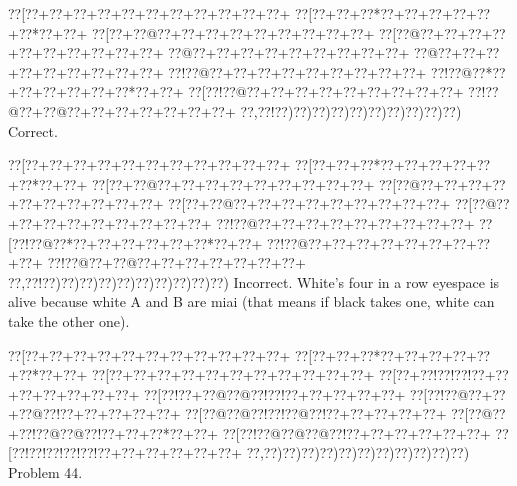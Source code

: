 \documentclass[a5paper]{article}
\begin{document}
\begin{center}
{\goo
\0??[\0??+\0??+\0??+\0??+\0??+\0??+\0??+\0??+\0??+\0??+\0??+
\0??[\0??+\0??+\0??*\0??+\0??+\0??+\0??+\0??+\0??*\0??+\0??+
\0??[\0??+\0??@\0??+\0??+\0??+\0??+\0??+\0??+\0??+\0??+\0??+
\0??[\0??@\0??+\0??+\0??+\0??+\0??+\0??+\0??+\0??+\0??+\0??+
\0??@\0??+\0??+\0??+\0??+\0??+\0??+\0??+\0??+\0??+
\0??@\0??+\0??+\0??+\0??+\0??+\0??+\0??+\0??+\0??+
\0??!\0??@\0??+\0??+\0??+\0??+\0??+\0??+\0??+\0??+\0??+
\0??!\0??@\0??*\0??+\0??+\0??+\0??+\0??+\0??*\0??+\0??+
\0??[\0??!\0??@\0??+\0??+\0??+\0??+\0??+\0??+\0??+\0??+\0??+
\0??!\0??@\0??+\0??@\0??+\0??+\0??+\0??+\0??+\0??+\0??+
\0??,\0??!\0??)\0??)\0??)\0??)\0??)\0??)\0??)\0??)\0??)\0??)
}
Correct. 

\end{center}
\begin{center}
{\goo
\0??[\0??+\0??+\0??+\0??+\0??+\0??+\0??+\0??+\0??+\0??+\0??+
\0??[\0??+\0??+\0??*\0??+\0??+\0??+\0??+\0??+\0??*\0??+\0??+
\0??[\0??+\0??@\0??+\0??+\0??+\0??+\0??+\0??+\0??+\0??+\0??+
\0??[\0??@\0??+\0??+\0??+\0??+\0??+\0??+\0??+\0??+\0??+\0??+
\0??[\0??+\0??@\0??+\0??+\0??+\0??+\0??+\0??+\0??+\0??+\0??+
\0??[\0??@\0??+\0??+\0??+\0??+\0??+\0??+\0??+\0??+\0??+
\0??!\0??@\0??+\0??+\0??+\0??+\0??+\0??+\0??+\0??+\0??+
\0??[\0??!\0??@\0??*\0??+\0??+\0??+\0??+\0??+\0??*\0??+\0??+
\0??!\0??@\0??+\0??+\0??+\0??+\0??+\0??+\0??+\0??+\0??+
\0??!\0??@\0??+\0??@\0??+\0??+\0??+\0??+\0??+\0??+\0??+
\0??,\0??!\0??)\0??)\0??)\0??)\0??)\0??)\0??)\0??)\0??)\0??)
}
Incorrect. White's four in a row eyespace is alive because white A and B are miai (that means if black takes one, white can take the other one).

\end{center}
\newpage
\begin{center}
{\goo
\0??[\0??+\0??+\0??+\0??+\0??+\0??+\0??+\0??+\0??+\0??+\0??+
\0??[\0??+\0??+\0??*\0??+\0??+\0??+\0??+\0??+\0??*\0??+\0??+
\0??[\0??+\0??+\0??+\0??+\0??+\0??+\0??+\0??+\0??+\0??+\0??+
\0??[\0??+\0??!\0??!\0??!\0??+\0??+\0??+\0??+\0??+\0??+\0??+
\0??[\0??!\0??+\0??@\0??@\0??!\0??!\0??+\0??+\0??+\0??+\0??+
\0??[\0??!\0??@\0??+\0??+\0??@\0??!\0??+\0??+\0??+\0??+\0??+
\0??[\0??@\0??@\0??!\0??!\0??@\0??!\0??+\0??+\0??+\0??+\0??+
\0??[\0??@\0??+\0??!\0??@\0??@\0??!\0??+\0??+\0??*\0??+\0??+
\0??[\0??!\0??@\0??@\0??@\0??!\0??+\0??+\0??+\0??+\0??+\0??+
\0??[\0??!\0??!\0??!\0??!\0??!\0??+\0??+\0??+\0??+\0??+\0??+
\0??,\0??)\0??)\0??)\0??)\0??)\0??)\0??)\0??)\0??)\0??)\0??)
}
Problem 44.

\end{center}
\end{document}
